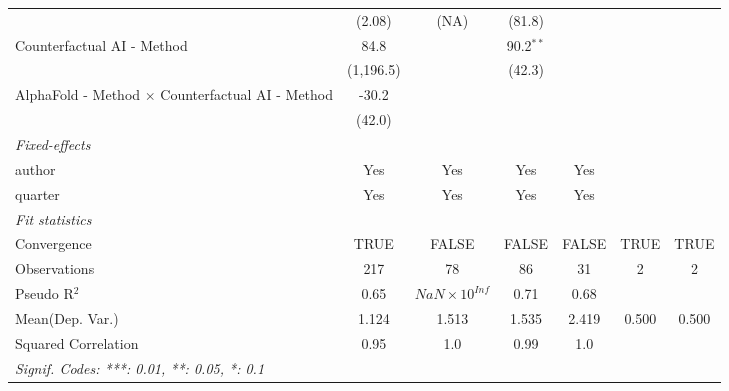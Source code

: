 \begin{tabular}{lcccccc}
                                                           & (2.08)    & (NA)                    & (81.8)      &             &      &   \\   
   Counterfactual AI - Method                              & 84.8      &                         & 90.2$^{**}$ &             &      &   \\   
                                                           & (1,196.5) &                         & (42.3)      &             &      &   \\   
   AlphaFold - Method $\times$ Counterfactual AI - Method  & -30.2     &                         &             &             &      &   \\   
                                                           & (42.0)    &                         &             &             &      &   \\   
   \midrule
   \emph{Fixed-effects}\\
   author                                                  & Yes       & Yes                     & Yes         & Yes         &      & \\  
   quarter                                                 & Yes       & Yes                     & Yes         & Yes         &      & \\  
   \midrule
   \emph{Fit statistics}\\
   Convergence                                             &TRUE       & FALSE                   & FALSE       & FALSE       & TRUE & TRUE\\  
   Observations                                            & 217       & 78                      & 86          & 31          & 2    & 2\\  
   Pseudo R$^2$                                            & 0.65      & $NaN\times 10^{Inf}$    & 0.71        & 0.68        &      & \\  
Mean(Dep. Var.) & 1.124 & 1.513 & 1.535 & 2.419 & 0.500 & 0.500 \\
   Squared Correlation                                     & 0.95      & 1.0                     & 0.99        & 1.0         &      & \\  
   \midrule \midrule
   \multicolumn{7}{l}{\emph{Signif. Codes: ***: 0.01, **: 0.05, *: 0.1}}\\
\end{tabular}
\par\endgroup
